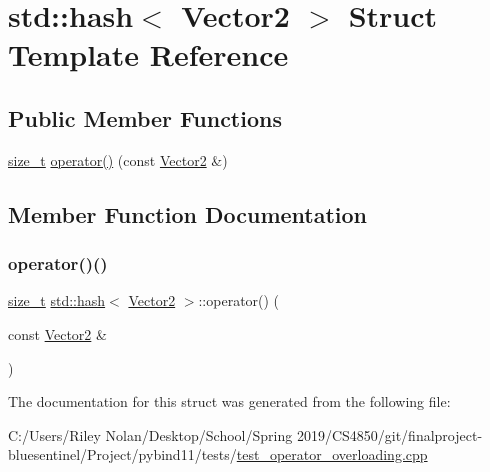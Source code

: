 \hypertarget{structstd_1_1hash_3_01_vector2_01_4}{}\section{std\+::hash$<$ Vector2 $>$ Struct Template Reference}
\label{structstd_1_1hash_3_01_vector2_01_4}
\subsection*{Public Member Functions}
\begin{DoxyCompactItemize}
\item 
\mbox{\hyperlink{detail_2common_8h_a801d6a451a01953ef8cbae6feb6a3638}{size\+\_\+t}} \mbox{\hyperlink{structstd_1_1hash_3_01_vector2_01_4_a9bad507c734a28ceafd387e949213e74}{operator()}} (const \mbox{\hyperlink{class_vector2}{Vector2}} \&)
\end{DoxyCompactItemize}


\subsection{Member Function Documentation}
\mbox{\label{structstd_1_1hash_3_01_vector2_01_4_a9bad507c734a28ceafd387e949213e74}} 
\subsubsection{\texorpdfstring{operator()()}{operator()()}}
{\footnotesize\ttfamily \mbox{\hyperlink{detail_2common_8h_a801d6a451a01953ef8cbae6feb6a3638}{size\+\_\+t}} \mbox{\hyperlink{group__python__builtins_ga117a7eab72791313448c40a2f25f3582}{std\+::hash}}$<$ \mbox{\hyperlink{class_vector2}{Vector2}} $>$\+::operator() (\begin{DoxyParamCaption}\item[{const \mbox{\hyperlink{class_vector2}{Vector2}} \&}]{ }\end{DoxyParamCaption})\hspace{0.3cm}{\ttfamily [inline]}}



The documentation for this struct was generated from the following file\+:\begin{DoxyCompactItemize}
\item 
C\+:/\+Users/\+Riley Nolan/\+Desktop/\+School/\+Spring 2019/\+C\+S4850/git/finalproject-\/bluesentinel/\+Project/pybind11/tests/\mbox{\hyperlink{test__operator__overloading_8cpp}{test\+\_\+operator\+\_\+overloading.\+cpp}}\end{DoxyCompactItemize}
